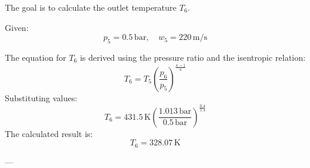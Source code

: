 The goal is to calculate the outlet temperature \( T_6 \).  

Given:  
\[
p_5 = 0.5 \, \text{bar}, \quad w_5 = 220 \, \text{m/s}
\]  

The equation for \( T_6 \) is derived using the pressure ratio and the isentropic relation:  
\[
T_6 = T_5 \left( \frac{p_6}{p_5} \right)^{\frac{\kappa - 1}{\kappa}}
\]  
Substituting values:  
\[
T_6 = 431.5 \, \text{K} \left( \frac{1.013 \, \text{bar}}{0.5 \, \text{bar}} \right)^{\frac{0.4}{1.4}}
\]  
The calculated result is:  
\[
T_6 = 328.07 \, \text{K}
\]  

---